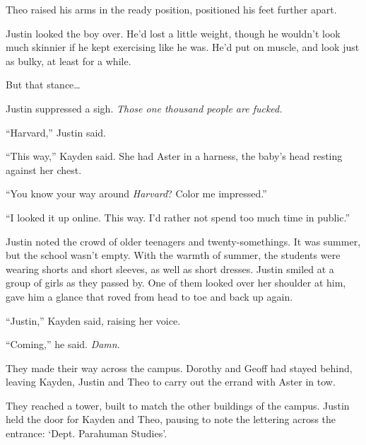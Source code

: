 Theo raised his arms in the ready position, positioned his feet further apart.



Justin looked the boy over.  He'd lost a little weight, though he wouldn't look much skinnier if he kept exercising like he was.  He'd put on muscle, and look just as bulky, at least for a while.



But that stance\ldots



Justin suppressed a sigh.  \emph{Those one thousand people are fucked.}



\blacksquare



``Harvard,'' Justin said.



``This way,'' Kayden said.  She had Aster in a harness, the baby's head resting against her chest.



``You know your way around \emph{Harvard}?  Color me impressed.''



``I looked it up online.  This way.  I'd rather not spend too much time in public.''



Justin noted the crowd of older teenagers and twenty-somethings.  It was summer, but the school wasn't empty.  With the warmth of summer, the students were wearing shorts and short sleeves, as well as short dresses.  Justin smiled at a group of girls as they passed by.  One of them looked over her shoulder at him, gave him a glance that roved from head to toe and back up again.



``Justin,'' Kayden said, raising her voice.



``Coming,'' he said.  \emph{Damn}.



They made their way across the campus.  Dorothy and Geoff had stayed behind, leaving Kayden, Justin and Theo to carry out the errand with Aster in tow.



They reached a tower, built to match the other buildings of the campus.  Justin held the door for Kayden and Theo, pausing to note the lettering across the entrance: `Dept. Parahuman Studies'.



